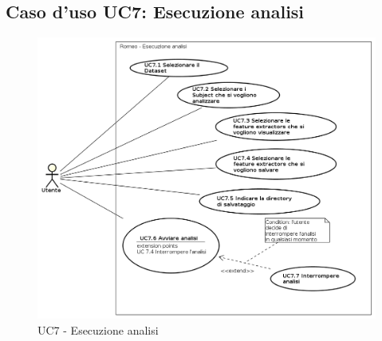 \subsection{Caso d'uso UC7: Esecuzione analisi}
\begin{figure}[!h]
\begin{center}
\includegraphics[scale=0.5]{./img/Use_Case/UC7}
\caption{UC7 - Esecuzione analisi}
\end{center}
\end{figure}
